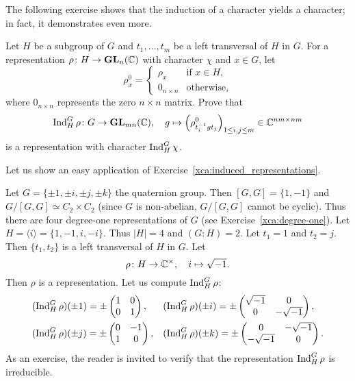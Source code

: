 The following exercise shows that the induction of a character yields a character; in fact, it demonstrates even more.

\begin{exercise}
    \label{xca:induced_representations}
    Let $H$ be a subgroup of $G$ and 
    $t_1,\dots,t_m$ be a left transversal of $H$ in $G$. For a representation $\rho\colon H\to\mathbf{GL}_n(\mathbb{C})$ with character $\chi$ 
    and $x\in G$, let 
    \[
    \rho_x^0=\begin{cases}
        \rho_x & \text{if $x\in H$,}\\
        0_{n\times n} & \text{otherwise,}
    \end{cases}
    \]
    where $0_{n\times n}$ represents the zero
    $n\times n$ matrix. Prove that 
    \[
    \operatorname{Ind}_H^G\rho\colon G\to \mathbf{GL}_{mn}(\mathbb{C}),\quad 
    g\mapsto \left(\rho_{t_i^{-1}gt_j}^0\right)_{1\leq i,j\leq m}\in\mathbb{C}^{nm\times nm}
    \]
    is a representation with character $\operatorname{Ind}_H^G\chi$. 
\end{exercise}

Let us show an easy application of Exercise~\ref{xca:induced_representations}. 

\begin{example}
    Let $G=\{\pm1,\pm i,\pm j,\pm k\}$ the quaternion group. Then $[G,G]=\{1,-1\}$ and $G/[G,G]\simeq C_2\times C_2$ (since $G$ is non-abelian, $G/[G,G]$ cannot be cyclic). Thus 
    there are four degree-one representations of $G$ (see Exercise~\ref{xca:degree-one}). Let $H=\langle i\rangle=\{1,-1,i,-i\}$. Thus $|H|=4$ and $(G:H)=2$. 
    Let $t_1=1$ and $t_2=j$. Then $\{t_1,t_2\}$ is a left
    transversal of $H$ in $G$. Let 
    \[
    \rho\colon H\to\mathbb{C}^{\times},\quad i\mapsto\sqrt{-1}.
    \]
    Then $\rho$ is a representation. Let us compute $\operatorname{Ind}_H^G\rho$:
    \begin{align*}
        &(\operatorname{Ind}_H^G\rho)(\pm1)=\pm\begin{pmatrix}
            1&0\\0&1
        \end{pmatrix},
        &&
        (\operatorname{Ind}_H^G\rho)(\pm i)=\pm\begin{pmatrix}
            \sqrt{-1}&0\\0&-\sqrt{-1}
        \end{pmatrix},\\
        &
        (\operatorname{Ind}_H^G\rho)(\pm j)=\pm\begin{pmatrix}
            0&-1\\1&0
        \end{pmatrix},
        &&
        (\operatorname{Ind}_H^G\rho)(\pm k)=\pm\begin{pmatrix}
            0&-\sqrt{-1}\\-\sqrt{-1}&0
        \end{pmatrix}.
    \end{align*}
    As an exercise, the reader is invited to verify that the representation $\operatorname{Ind}_H^G\rho$ is irreducible.
\end{example}


